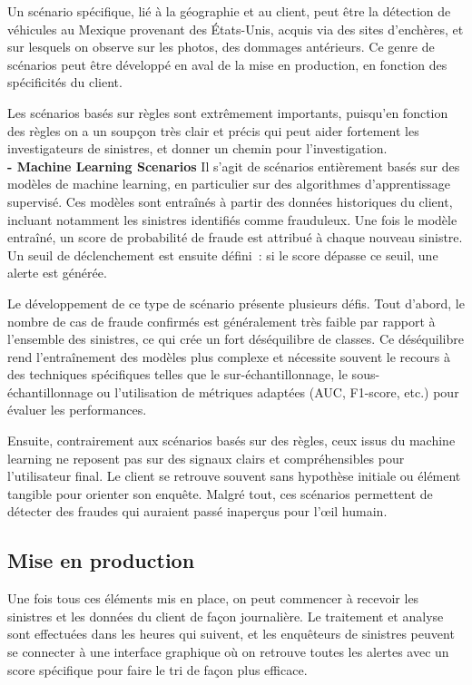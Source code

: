 \documentclass [twoside,openright,a4paper,11pt,french] {report}
\begin{document}
Un scénario spécifique, lié à la géographie et au client, peut être la détection de véhicules au Mexique provenant des États-Unis,  
acquis via des sites d'enchères, et sur lesquels on observe sur les photos, des dommages antérieurs.  
Ce genre de scénarios peut être développé en aval de la mise en production, en fonction des spécificités du client. 

Les scénarios basés sur règles sont extrêmement importants, puisqu'en fonction des règles on a un soupçon très clair et précis 
qui peut aider fortement les investigateurs de sinistres, et donner un chemin pour l'investigation. \\


\textbf{- Machine Learning Scenarios}
Il s'agit de scénarios entièrement basés sur des modèles de machine learning, en particulier sur des algorithmes d'apprentissage supervisé.  
Ces modèles sont entraînés à partir des données historiques du client, incluant notamment les sinistres identifiés comme frauduleux.  
Une fois le modèle entraîné, un score de probabilité de fraude est attribué à chaque nouveau sinistre.  
Un seuil de déclenchement est ensuite défini~: si le score dépasse ce seuil, une alerte est générée.

Le développement de ce type de scénario présente plusieurs défis.  
Tout d'abord, le nombre de cas de fraude confirmés est généralement très faible par rapport à l'ensemble des sinistres,  
ce qui crée un fort déséquilibre de classes. Ce déséquilibre rend l'entraînement des modèles plus complexe et nécessite souvent  
le recours à des techniques spécifiques telles que le sur-échantillonnage, le sous-échantillonnage ou l'utilisation de métriques adaptées  
(AUC, F1-score, etc.) pour évaluer les performances.

Ensuite, contrairement aux scénarios basés sur des règles, ceux issus du machine learning ne reposent pas sur des signaux clairs et compréhensibles pour l'utilisateur final.  
Le client se retrouve souvent sans hypothèse initiale ou élément tangible pour orienter son enquête.  
Malgré tout, ces scénarios permettent de détecter des fraudes qui auraient passé inaperçus pour l'œil humain. 




\subsection{Mise en production}

Une fois tous ces éléments mis en place, on peut commencer à recevoir les sinistres et les données du client de façon 
journalière. Le traitement et analyse sont effectuées dans les heures qui suivent, et les enquêteurs de sinistres peuvent se connecter 
à une interface graphique où on retrouve toutes les alertes avec un score spécifique pour faire le tri de façon plus efficace. 
\end{document}
